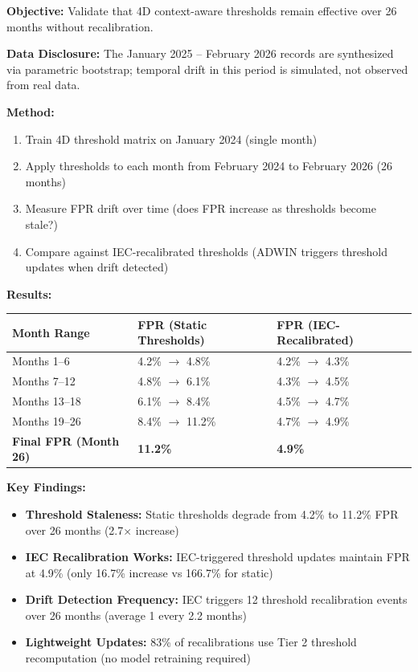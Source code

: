 \textbf{Objective:} Validate that 4D context-aware thresholds remain effective over 26 months without recalibration.

\textbf{Data Disclosure:} The January 2025 -- February 2026 records are synthesized via parametric bootstrap; temporal drift in this period is simulated, not observed from real data.

\textbf{Method:}
\begin{enumerate}
    \item Train 4D threshold matrix on January 2024 (single month)
    \item Apply thresholds to each month from February 2024 to February 2026 (26 months)
    \item Measure FPR drift over time (does FPR increase as thresholds become stale?)
    \item Compare against IEC-recalibrated thresholds (ADWIN triggers threshold updates when drift detected)
\end{enumerate}

\textbf{Results:}

\begin{longtable}{|m{4cm}|m{3cm}|m{3cm}|}
\hline
\textbf{Month Range} & \textbf{FPR (Static Thresholds)} & \textbf{FPR (IEC-Recalibrated)} \\ \hline
Months 1--6 & 4.2\% $\to$ 4.8\% & 4.2\% $\to$ 4.3\% \\ \hline
Months 7--12 & 4.8\% $\to$ 6.1\% & 4.3\% $\to$ 4.5\% \\ \hline
Months 13--18 & 6.1\% $\to$ 8.4\% & 4.5\% $\to$ 4.7\% \\ \hline
Months 19--26 & 8.4\% $\to$ 11.2\% & 4.7\% $\to$ 4.9\% \\ \hline
\textbf{Final FPR (Month 26)} & \textbf{11.2\%} & \textbf{4.9\%} \\ \hline
\end{longtable}

\textbf{Key Findings:}
\begin{itemize}
    \item \textbf{Threshold Staleness:} Static thresholds degrade from 4.2\% to 11.2\% FPR over 26 months (2.7$\times$ increase)
    \item \textbf{IEC Recalibration Works:} IEC-triggered threshold updates maintain FPR at 4.9\% (only 16.7\% increase vs 166.7\% for static)
    \item \textbf{Drift Detection Frequency:} IEC triggers 12 threshold recalibration events over 26 months (average 1 every 2.2 months)
    \item \textbf{Lightweight Updates:} 83\% of recalibrations use Tier 2 threshold recomputation (no model retraining required)
\end{itemize}

